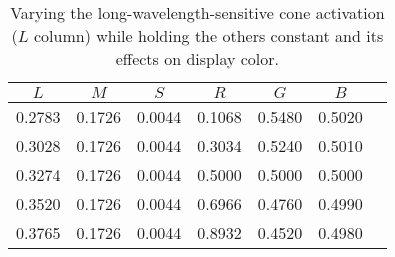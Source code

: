 \documentclass[twocolumn]{article}
\begin{document}
\begin{table}[h]
    \begin{tabular}{c|c|c|c|c|c|c}
        \hline
        $L$ & $M$ & $S$ & $R$ & $G$ & $B$\\
        \hline
        0.2783 & 0.1726 & 0.0044 & 0.1068 & 0.5480 & 0.5020 & \cellcolor{l1}\\
        0.3028 & 0.1726 & 0.0044 & 0.3034 & 0.5240 & 0.5010 & \cellcolor{l2}\\
        0.3274 & 0.1726 & 0.0044 & 0.5000 & 0.5000 & 0.5000 & \cellcolor{l3}\\
        0.3520 & 0.1726 & 0.0044 & 0.6966 & 0.4760 & 0.4990 & \cellcolor{l4}\\
        0.3765 & 0.1726 & 0.0044 & 0.8932 & 0.4520 & 0.4980 & \cellcolor{l5}
    \end{tabular}
    \caption{Varying the long-wavelength-sensitive cone activation ($L$ column) while holding the others constant and its effects on display color.}\label{table:varying_l_cone_activation}
\end{table}
\twocolumn[{\printbibliography}]
\end{document}
